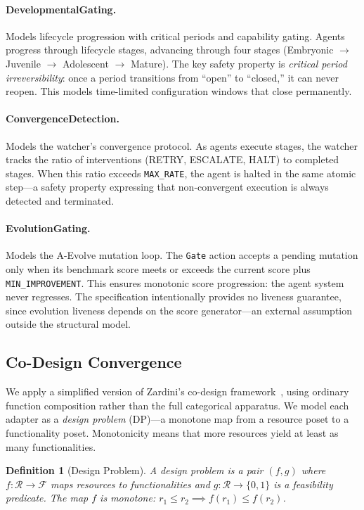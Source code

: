 \documentclass[11pt]{article}
\newtheorem{definition}{Definition}
\begin{document}
\paragraph{DevelopmentalGating.}
Models lifecycle progression with critical periods and capability gating.
Agents progress through lifecycle stages, advancing through four stages
(Embryonic $\to$ Juvenile $\to$ Adolescent $\to$ Mature).  The key
safety property is \emph{critical period irreversibility}: once a period
transitions from ``open'' to ``closed,'' it can never reopen.  This models time-limited configuration windows that close permanently.

\paragraph{ConvergenceDetection.}
Models the watcher's convergence protocol.  As agents execute stages,
the watcher tracks the ratio of interventions (RETRY, ESCALATE, HALT) to
completed stages.  When this ratio exceeds \texttt{MAX\_RATE}, the
agent is halted in the same atomic step---a safety property expressing
that non-convergent execution is always detected and terminated.

\paragraph{EvolutionGating.}
Models the A-Evolve mutation loop.  The \texttt{Gate} action accepts a
pending mutation only when its benchmark score meets or exceeds the current
score plus \texttt{MIN\_IMPROVEMENT}.  This ensures monotonic score
progression: the agent system never regresses.  The specification intentionally
provides no liveness guarantee, since evolution liveness depends on the
score generator---an external assumption outside the structural model.

\subsection{Co-Design Convergence}\label{sec:codesign}

We apply a simplified version of Zardini's co-design
framework~\cite{zardini2023codesign}, using ordinary function composition
rather than the full categorical apparatus.  We model each adapter as a
\emph{design problem} (DP)---a monotone map from a resource poset to a
functionality poset.  Monotonicity means that more resources yield at
least as many functionalities.

\begin{definition}[Design Problem]
A design problem is a pair $(f, g)$ where $f: \mathcal{R} \to \mathcal{F}$
maps resources to functionalities and $g: \mathcal{R} \to \{0, 1\}$ is a
feasibility predicate.  The map $f$ is monotone: $r_1 \leq r_2 \implies
f(r_1) \leq f(r_2)$.
\end{definition}
\end{document}
